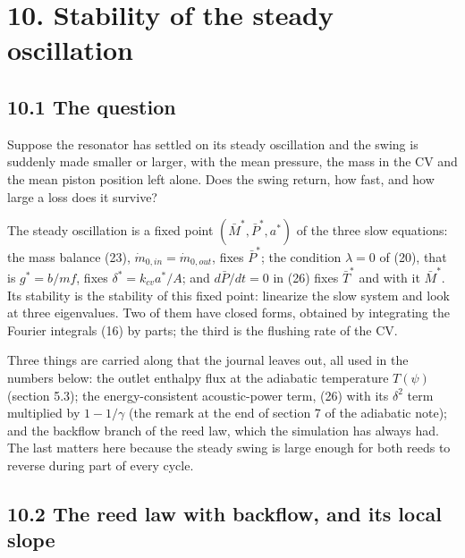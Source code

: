 \section*{10. Stability of the steady oscillation}

\subsection*{10.1 The question}

Suppose the resonator has settled on its steady oscillation and the swing is suddenly made smaller or larger, with the mean pressure, the mass in the CV and the mean piston position left alone. Does the swing return, how fast, and how large a loss does it survive?

The steady oscillation is a fixed point $(\bar M^*, \bar P^*, a^*)$ of the three slow equations: the mass balance (23), $\dot m_{0,in} = \dot m_{0,out}$, fixes $\bar P^*$; the condition $\lambda = 0$ of (20), that is $g^* = b/mf$, fixes $\delta^* = k_{cv}a^*/A$; and $d\bar P/dt = 0$ in (26) fixes $\bar T^*$ and with it $\bar M^*$. Its stability is the stability of this fixed point: linearize the slow system and look at three eigenvalues. Two of them have closed forms, obtained by integrating the Fourier integrals (16) by parts; the third is the flushing rate of the CV.

Three things are carried along that the journal leaves out, all used in the numbers below: the outlet enthalpy flux at the adiabatic temperature $T(\psi)$ (section 5.3); the energy-consistent acoustic-power term, (26) with its $\delta^2$ term multiplied by $1 - 1/\gamma$ (the remark at the end of section 7 of the adiabatic note); and the backflow branch of the reed law, which the simulation has always had. The last matters here because the steady swing is large enough for both reeds to reverse during part of every cycle.

\subsection*{10.2 The reed law with backflow, and its local slope}

